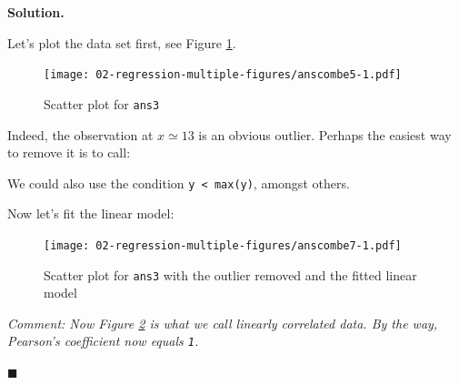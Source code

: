 \documentclass[10pt,b5paper,krantz1]{krantz}
\newenvironment{Shaded}{\begin{snugshade}}{\end{snugshade}}
\newcommand{\CommentTok}[1]{\textcolor[rgb]{0.37,0.37,0.37}{\textit{#1}}}
\newcommand{\DataTypeTok}[1]{\textcolor[rgb]{0.27,0.27,0.27}{#1}}
\newcommand{\DecValTok}[1]{\textcolor[rgb]{0.06,0.06,0.06}{#1}}
\newcommand{\KeywordTok}[1]{\textcolor[rgb]{0.27,0.27,0.27}{\textbf{#1}}}
\newcommand{\NormalTok}[1]{#1}
\newcommand{\OperatorTok}[1]{\textcolor[rgb]{0.43,0.43,0.43}{\textbf{#1}}}
\newcommand{\StringTok}[1]{\textcolor[rgb]{0.5,0.5,0.5}{#1}}
\newenvironment{solution}{%
\bigskip\noindent\textbf{Solution. }%
\it\ignorespaces%
\ignorespaces%
}{\ignorespaces%
\hfill$\blacksquare$%
}
\begin{document}
\begin{solution}

Let's plot the data set first, see Figure \ref{fig:anscombe5}.

\begin{Shaded}
\end{Shaded}

\begin{figure}
\hypertarget{fig:anscombe5}{%
\centering
\texttt{[image: 02-regression-multiple-figures/anscombe5-1.pdf]}
\caption{Scatter plot for \texttt{ans3}}\label{fig:anscombe5}
}
\end{figure}

Indeed, the observation at \(x\simeq 13\) is an obvious outlier.
Perhaps the easiest way
to remove it is to call:

\begin{Shaded}
\end{Shaded}

We could also use the condition \texttt{y\ \textless{}\ max(y)}, amongst others.

Now let's fit the linear model:

\begin{Shaded}
\end{Shaded}

\begin{figure}
\hypertarget{fig:anscombe7}{%
\centering
\texttt{[image: 02-regression-multiple-figures/anscombe7-1.pdf]}
\caption{Scatter plot for \texttt{ans3} with the outlier removed and the fitted linear model}\label{fig:anscombe7}
}
\end{figure}

\emph{Comment: Now Figure \ref{fig:anscombe7} is what we call linearly correlated data.
By the way, Pearson's coefficient now equals \texttt{1}.}

\end{solution}
\end{document}
